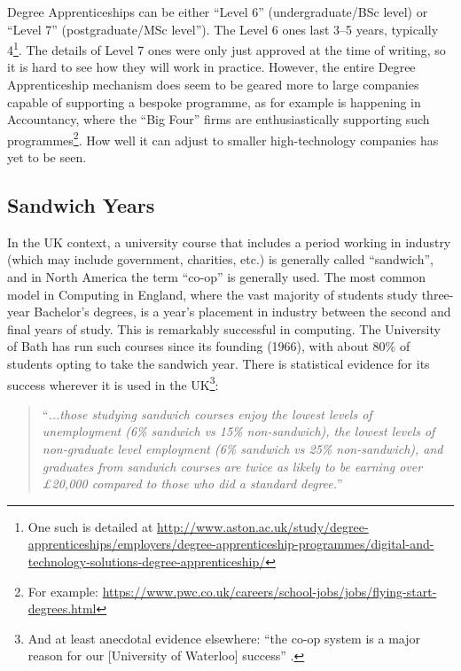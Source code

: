 \documentclass[sigconf,anonymous]{acmart}
\begin{document}
Degree Apprenticeships can be either ``Level 6'' (undergraduate/BSc
level) or ``Level 7'' (postgraduate/MSc level''). The Level 6 ones
last 3--5 years, typically 4\footnote{One such is detailed at
\url{http://www.aston.ac.uk/study/degree-apprenticeships/employers/degree-apprenticeship-programmes/digital-and-technology-solutions-degree-apprenticeship/}}. The
details of Level 7 ones \cite{IfA2018a} were only just approved at the
time of writing, so it is hard to see how they will work in
practice. However, the entire Degree Apprenticeship mechanism does
seem to be geared more to large companies capable of supporting a
bespoke programme, as for example is happening in Accountancy, where
the ``Big Four'' firms are enthusiastically supporting such
programmes\footnote{For example:
\url{https://www.pwc.co.uk/careers/school-jobs/jobs/flying-start-degrees.html}}. How
well it can adjust to smaller high-technology companies has yet to be
seen.

\subsection{Sandwich Years}

In the UK context, a university course that includes a period
working in industry (which may include government, charities, etc.) is
generally called ``sandwich'', and in North America the term ``co-op''
is generally used. The most common model in Computing in England,
where the vast majority of students study three-year Bachelor's
degrees, is a year's placement in industry between the second and
final years of study. This is remarkably successful in computing. The
University of Bath has run such courses since its founding (1966),
with about 80\% of students opting to take the sandwich year. There is
statistical evidence for its success wherever it is used in the
UK\footnote{And at least anecdotal evidence elsewhere: ``the co-op
system is a major reason for our [University of Waterloo] success''
\cite{Watt2017a}.}:

\begin{quote} ``{\emph{...those studying sandwich courses enjoy the lowest levels
of unemployment (6\% sandwich vs 15\% non-sandwich), the lowest levels
of non-graduate level employment (6\% sandwich vs 25\% non-sandwich),
and graduates from sandwich courses are twice as likely to be earning
over \pounds20,000 compared to those who did a standard
degree.}}''~\cite{Shadbolt2016a}
\end{quote}
\end{document}
